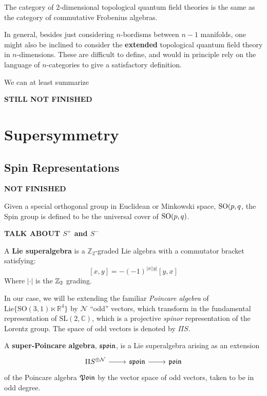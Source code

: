 	\begin{theorem}
		The category of 2-dimensional topological quantum field theories is the same as the category of commutative Frobenius algebras.
	\end{theorem}
	
	In general, besides just considering $n$-bordisms between $n-1$ manifolds, one might also be inclined to consider the  \textbf{extended} topological quantum field theory in $n$-dimensions.
	These are difficult to define, and would in principle rely on the language of $n$-categories to give a satisfactory definition. 
	
	We can at least summarize 
	
	\textbf{STILL NOT FINISHED}
	

	\section{Supersymmetry} %
	\label{sec:supersymmetry}
	\subsection{Spin Representations} %
	\label{sub:spin_representations}

		\textbf{NOT FINISHED}

		Given a special orthogonal group in Euclidean or Minkowski space, $\mathrm{SO}(p, q$, the Spin group is defined to be the universal cover of $\mathrm{SO}(p, q)$.
		
		\textbf{TALK ABOUT $S^+$ and $S^-$}
		


	\begin{defn}
	A \textbf{Lie superalgebra} is a $\mathbb Z_2$-graded Lie algebra with a commutator bracket satisfying:
		$$[x, y]= -(-1)^{|x||y|} [y, x]$$
	Where $|\cdot|$ is the $\mathbb{Z}_2$ grading.
	\end{defn}
	In our case, we will be extending the familiar \emph{Poincare algebra} of $\mathrm{Lie}\{ \mathrm{SO}(3, 1) \ltimes \mathbb R^4  \}$ by $\mathcal N$ ``odd'' vectors, which transform in the fundamental representation of $\mathrm{SL(2, \mathbb C)}$, which is a projective \emph{spinor} representation of the Lorentz group. The space of odd vectors is denoted by $\Pi S$.
	\begin{defn}
		A \textbf{super-Poincare algebra}, $\frak{spoin}$, is a Lie superalgebra arising as an extension
		\[
			\begin{tikzcd}
				\Pi S^{\oplus \mathcal N} \arrow[r] & \frak{spoin} \arrow[r] & \frak{poin}
			\end{tikzcd}
		\]
		of the Poincare algebra $\frak{Poin}$ by the vector space of odd vectors, taken to be in odd degree.
	\end{defn}
	
